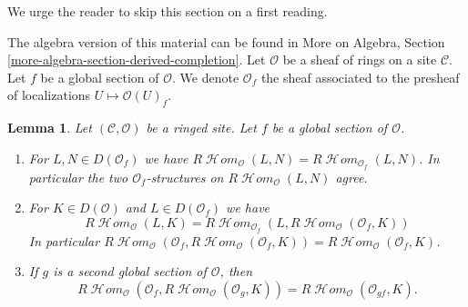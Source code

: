 \documentclass{stacks-project}
\theoremstyle{plain}
\newtheorem{lemma}[subsection]{Lemma}
\theoremstyle{definition}
\theoremstyle{remark}
\numberwithin{equation}{subsection}
\def\SheafHom{\mathop{\mathcal{H}\!\mathit{om}}\nolimits}
\begin{document}
\noindent
We urge the reader to skip this section on a first reading.

\medskip\noindent
The algebra version of this material can be found in
More on Algebra, Section \ref{more-algebra-section-derived-completion}.
Let $\mathcal{O}$ be a sheaf of rings on a site $\mathcal{C}$.
Let $f$ be a global section of $\mathcal{O}$. We denote
$\mathcal{O}_f$ the sheaf associated to the presheaf of localizations
$U \mapsto \mathcal{O}(U)_f$.

\begin{lemma}
\label{lemma-map-twice-localize}
Let $(\mathcal{C}, \mathcal{O})$ be a ringed site. Let $f$ be a global
section of $\mathcal{O}$.
\begin{enumerate}
\item For $L, N \in D(\mathcal{O}_f)$ we have
$R\SheafHom_\mathcal{O}(L, N) = R\SheafHom_{\mathcal{O}_f}(L, N)$.
In particular the two $\mathcal{O}_f$-structures on
$R\SheafHom_\mathcal{O}(L, N)$ agree.
\item For $K \in D(\mathcal{O})$ and
$L \in D(\mathcal{O}_f)$ we have
$$
R\SheafHom_\mathcal{O}(L, K) =
R\SheafHom_{\mathcal{O}_f}(L, R\SheafHom_\mathcal{O}(\mathcal{O}_f, K))
$$
In particular
$R\SheafHom_\mathcal{O}(\mathcal{O}_f,
R\SheafHom_\mathcal{O}(\mathcal{O}_f, K)) =
R\SheafHom_\mathcal{O}(\mathcal{O}_f, K)$.
\item If $g$ is a second global
section of $\mathcal{O}$, then
$$
R\SheafHom_\mathcal{O}(\mathcal{O}_f, R\SheafHom_\mathcal{O}(\mathcal{O}_g, K))
= R\SheafHom_\mathcal{O}(\mathcal{O}_{gf}, K).
$$
\end{enumerate}
\end{lemma}
\end{document}
